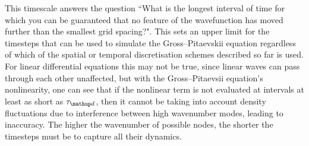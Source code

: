 This timescale answers the question ``What is the longest interval of time for which you can be guaranteed that no feature of the wavefunction has moved further than the smallest grid spacing?". This sets an upper limit for the timesteps that can be used to simulate the Gross--Pitaevskii equation regardless of which of the spatial or temporal discretisation schemes described so far is used. For linear differential equations this may not be true, since linear waves can pass through each other unaffected, but with the Gross--Pitaevsii equation's nonlinearity, one can see that if the nonlinear term is not evaluated at intervals at least as short as $\tau_\up d$, then it cannot be taking into account density fluctuations due to interference between high wavenumber modes, leading to inaccuracy. The higher the wavenumber of possible nodes, the shorter the timesteps must be to capture all their dynamics.

